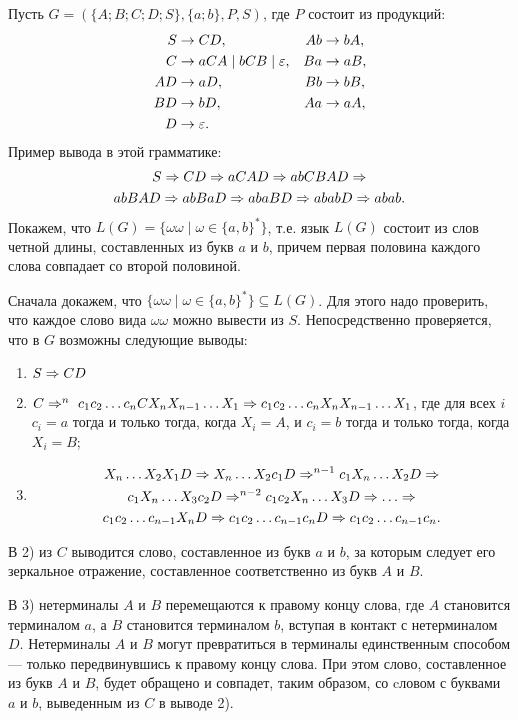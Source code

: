 \begin{myexample}
\label{exampleFreeGrammar}
Пусть $G=(\{A;B;C;D;S\},\{a;b\},P,S)$, где $P$ состоит из продукций:
\begin{align*}
	S  &\to CD, &
    Ab &\to bA, \\
	C  &\to aCA \mid bCB \mid \varepsilon, &
    Ba &\to aB, \\
	AD &\to aD, &
    Bb &\to bB, \\
	BD &\to bD, &
    Aa &\to aA,\\
	D  &\to \varepsilon.
\end{align*}
Пример вывода в этой грамматике:
\begin{multline}
	S \Rightarrow
    CD \Rightarrow 
    aCAD \Rightarrow
    abCBAD \Rightarrow \\
    abBAD \Rightarrow 
    abBaD \Rightarrow 
    abaBD \Rightarrow 
    ababD \Rightarrow 
    abab.
\end{multline}
Покажем, что $L(G)=\{\omega\omega\mid\omega\in\{a,b\}^*\}$, т.е. язык $L(G)$ состоит из слов четной длины, составленных из букв $a$ и $b$, причем первая половина каждого слова совпадает со второй половиной.

Сначала докажем, что $\{\omega\omega\mid\omega\in\{a,b\}^*\}\subseteq L(G)$. Для этого надо проверить, что каждое слово вида $\omega\omega$ можно вывести из $S$. Непосредственно проверяется, что в $G$ возможны следующие выводы:
\begin{enumerate}
	\item $S \Rightarrow CD$
	\item $C \Rightarrow^n~c_1c_2\ldots c_nCX_nX_{n-1}\ldots X_1 \Rightarrow c_1c_2\ldots c_nX_nX_{n-1}\ldots X_1$,  где для всех $i$ $c_i=a$ тогда и только тогда, когда $X_i=A$, и $c_i=b$ тогда и только тогда, когда $X_i=B$;
	\item
\begin{multline*}
    X_n\ldots X_2X_1D \To X_n\ldots X_2c_1D \To^{n-1} c_1X_n \ldots X_2D \To \\
     c_1X_n\ldots X_3c_2D \To^{n-2} c_1c_2X_n \ldots X_3D \To \dots \To \\
     c_1c_2\ldots c_{n-1}X_nD \To c_1c_2\ldots c_{n-1}c_nD \To c_1c_2\ldots c_{n-1}c_n.
\end{multline*}
\end{enumerate}

В 2) из $C$ выводится слово, составленное из букв $a$ и $b$, за которым следует его зеркальное отражение, составленное соответственно из букв $A$ и $B$.

В 3) нетерминалы $A$ и $B$ перемещаются к правому концу слова, где $A$ становится терминалом $a$, а $B$ становится терминалом $b$, вступая в контакт с нетерминалом $D$. Нетерминалы $A$ и $B$ могут превратиться в терминалы единственным способом --- только передвинувшись к правому концу слова. При этом слово, составленное из букв $A$ и $B$, будет обращено и совпадет, таким образом, со cловом с буквами $a$ и $b$, выведенным из $C$ в выводе 2).


\end{myexample}
